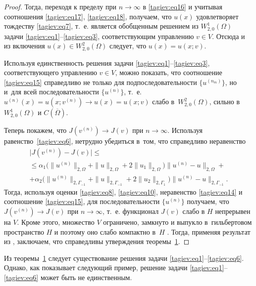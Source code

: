\begin{proof}
Тогда, переходя к пределу при $n\to \infty $ в \eqref{tagiev:eq16} и учитывая соотношения 
 \eqref{tagiev:eq17}, \eqref{tagiev:eq18}, получаем, что $u ( x )$ удовлетворяет тождеству \eqref{tagiev:eq7}, т.~е.
 является обобщенным решением из $W_{2,0}^1 ( \Omega )$ задачи 
 \eqref{tagiev:eq1}--\eqref{tagiev:eq3}, соответствующим управлению $ v  \in V$. Отсюда и из включения 
$u ( x )\in W_{2,0}^2 ( \Omega )$ следует, что $u (x )=u (x; v )$.

Используя единственность решения задачи \eqref{tagiev:eq1}--\eqref{tagiev:eq3}, соответствующего уп\-рав\-лению 
$ v  \in V$, можно показать, что соотношение \eqref{tagiev:eq15} справедливо не только 
для подпоследовательности $ \{ u^{ ( n_m)} \}$, но  и~для всей последовательности $ \{u^{ ( n )} \}$, 
т.~е. $u^{ ( n )} ( x )=u ( x; v  ^{ ( n )} )\to u ( x )=u (x; v )$ слабо в~$W_{2,0}^2 ( \Omega )$, сильно в~$W_{2,0}^1 ( \Omega )$ и $C (\overline \Omega )$.

Теперь покажем, что $J (  v ^{ ( n )} )\to 
J (  v  )$ при $n\to \infty $. 
Используя равенство~\eqref{tagiev:eq6},  нетрудно убедиться в~том, что справедливо неравенство
\begin{multline*}
\bigl | J (  v ^{ ( n )} )-J (  v   ) \bigr |\le 
\\
\le
 \alpha _1 \bigl( \| u^{ ( n )} \|_{2,\Omega } + \| u \|_{2,\Omega } +2 \| u_1 \|_{2,\Omega } \bigr) 
 \| u^{ ( n )}-u \|_{2,\Omega } +\\
+\alpha _2 \bigl( \| u^{ ( n )} \|_{2,\Gamma _{-1}} + \| u \|_{2,\Gamma _{-1}} +2 \| u_2 \|_{2,\Gamma _1 } \bigr) 
\|  u^{ ( n )}-u  \|_{2,\Gamma _{-1}}.
\end{multline*}
Тогда, используя оценки \eqref{tagiev:eq8}, \eqref{tagiev:eq10}, неравенство \eqref{tagiev:eq14} и соотношение \eqref{tagiev:eq15}, для  последовательности $\{u^{ ( n )}\}$ получаем, что $J ( v  ^{ ( n )} ) \to J (  v  )$ при 
$n\to \infty $, т.~е. функционал $J (  v  )$ слабо в $H$  непрерывен на $V$. 
Кроме этого, множество $V$ ограничено, замкнуто и выпукло  в~гильбертовом пространство $H$ и поэтому оно слабо компактно в~$H$ \cite[с.~51]{tagiev:bib18}. 
Тогда, применяя результат из \cite[с.~49]{tagiev:bib18}, заключаем, что справедливы утверждения теоремы~\hyperlink{tag:th1}{1}.
\end{proof}

\smallskip

\begin{remark}[1] Из теоремы~\hyperlink{tag:th1}{1} следует существование решения задачи \mbox{\eqref{tagiev:eq1}--\eqref{tagiev:eq6}.} 
Однако, как показывает следующий пример, решение задачи \eqref{tagiev:eq1}--\eqref{tagiev:eq6} может быть не единственным.
\end{remark}

